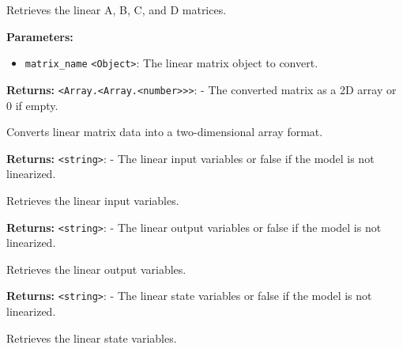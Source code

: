 \documentclass[12pt,a4paper]{article}
\begin{document}
\noindent Retrieves the linear A, B, C, and D matrices.

\vspace{5mm}
\noindent {}


\noindent \textbf{Parameters:}
\begin{itemize}
  \item \texttt{matrix\_name} \texttt{<Object>}: The linear matrix object to convert.
\end{itemize}

\noindent \textbf{Returns:} \texttt{<Array.<Array.<number>>>}: - The converted matrix as a 2D array or 0 if empty.

\noindent Converts linear matrix data into a two-dimensional array format.

\vspace{5mm}
\noindent {}


\noindent \textbf{Returns:} \texttt{<string>}: - The linear input variables or false if the model is not linearized.

\noindent Retrieves the linear input variables.

\vspace{5mm}
\noindent {}


\noindent \textbf{Returns:} \texttt{<string>}: - The linear output variables or false if the model is not linearized.

\noindent Retrieves the linear output variables.

\vspace{5mm}
\noindent {}


\noindent \textbf{Returns:} \texttt{<string>}: - The linear state variables or false if the model is not linearized.

\noindent Retrieves the linear state variables.

\vspace{5mm}
\noindent {}
\end{document}
